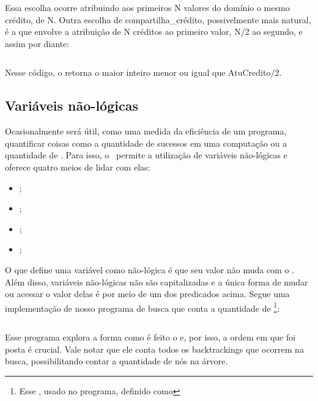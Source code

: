 Essa escolha ocorre atribuindo aos primeiros N valores do domínio o mesmo crédito, de N. Outra escolha de compartilha\_crédito, possivelmente mais natural, é a que envolve a atribuição de N créditos ao primeiro valor, N/2 ao segundo, e assim por diante:

    \begin{listing}
\inputminted{prolog}{../Exemplos/Cap8/prog4_partilha2.pl}
    \end{listing}

Nesse código, o  retorna o maior inteiro menor ou igual que AtuCredito/2.

\subsection{Variáveis não-lógicas}

  Ocasionalmente será útil, como uma medida da eficiência de um programa, quantificar coisas como a quantidade de sucessos em uma computação ou a quantidade de . Para isso, o \eclipse\ permite a utilização de variáveis não-lógicas e oferece quatro meios de lidar com elas:

  \begin{itemize}
    \item {};
    \item {};
    \item {};
    \item {};
  \end{itemize}

  O que define uma variável como não-lógica é que seu valor não muda com o .
  Além disso, variáveis não-lógicas não são capitalizadas e a única forma de mudar ou acessar o
  valor delas é por meio de um dos predicados acima. Segue uma implementação de nosso programa de
  busca que conta a quantidade de \footnote{Esse , usado no programa, definido como }:

    \begin{listing}
\inputminted{prolog}{../Exemplos/Cap8/prog5_busca3.pl}
    \end{listing}

Esse programa explora a forma como é feito o  e, por isso, a ordem em que foi posta é crucial. Vale notar que ele conta todos os backtrackings que ocorrem na busca, possibilitando contar a quantidade de nós na árvore.

